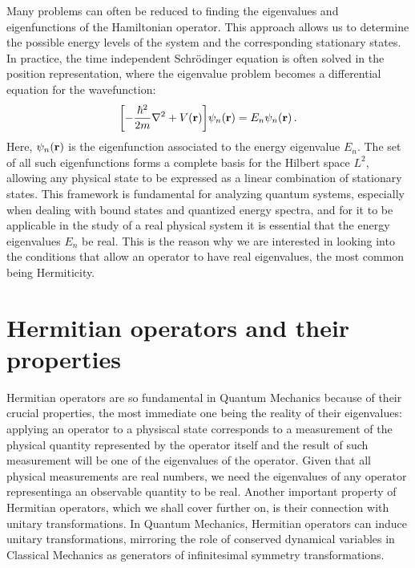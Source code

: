             Many problems can often be reduced to finding the eigenvalues and eigenfunctions of the Hamiltonian operator. This approach allows us to determine the possible energy levels of the system and the corresponding stationary states. In practice, the time independent Schr\"odinger equation is often solved in the position representation, where the eigenvalue problem becomes a differential equation for the wavefunction:
            \begin{equation}
                \label{eq:schrodinger-position}
                \bqty{-\frac{\hbar^2}{2m}\laplacian + V\pqty{\vb{r}}}\psi_n(\vb{r}) = E_n\psi_n(\vb{r})
                \myperiod
            \end{equation}
            Here, $\psi_n\pqty{\vb{r}}$ is the eigenfunction associated to the energy eigenvalue $E_n$. The set of all such eigenfunctions forms a complete basis for the Hilbert space $L^2$, allowing any physical state to be expressed as a linear combination of stationary states. This framework is fundamental for analyzing quantum systems, especially when dealing with bound states and quantized energy spectra, and for it to be applicable in the study of a real physical system it is essential that the energy eigenvalues $E_n$ be real. This is the reason why we are interested in looking into the conditions that allow an operator to have real eigenvalues, the most common being Hermiticity.

    \section{Hermitian operators and their properties}\label{s:hermitian-operators}
        Hermitian operators are so fundamental in Quantum Mechanics because of their crucial properties, the most immediate one being the reality of their eigenvalues: applying an operator to a physiscal state corresponds to a measurement of the physical quantity represented by the operator itself and the result of such measurement will be one of the eigenvalues of the operator. Given that all physical measurements are real numbers, we need the eigenvalues of any operator representinga an observable quantity to be real. Another important property of Hermitian operators, which we shall cover further on, is their connection with unitary transformations. In Quantum Mechanics, Hermitian operators can induce unitary transformations, mirroring the role of conserved dynamical variables in Classical Mechanics as generators of infinitesimal symmetry transformations.
        
